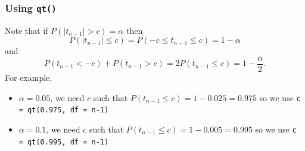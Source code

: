 \documentclass[a4paper]{article}\usepackage[]{graphicx}\usepackage[]{xcolor}
\begin{document}
\subsubsection{Using \lstinline|qt()|}
Note that if \( P(\lvert t_{n-1} \rvert > c) = \alpha \) then
\[
	P(\lvert t_{n-1} \rvert \leq c) = P(-c \leq t_{n-1} \leq c) = 1 - \alpha
\]
and
\[
	P(t_{n-1} < -c) + P(t_{n-1} > c) = 2P(t_{n-1} \leq c) = 1 - \frac{\alpha}{2}.
\]
For example,
\begin{itemize}
	\item \( \alpha = 0.05 \), we need \( c \) such that \( P(t_{n-1} \leq c) = 1 - 0.025 = 0.975 \) so we use \lstinline|c = qt(0.975, df = n-1)|
	\item \( \alpha = 0.1 \), we need \( c \) such that \( P(t_{n-1} \leq c) = 1 - 0.005 = 0.995 \) so we use \lstinline|c = qt(0.995, df = n-1)|
\end{itemize}
\end{document}
